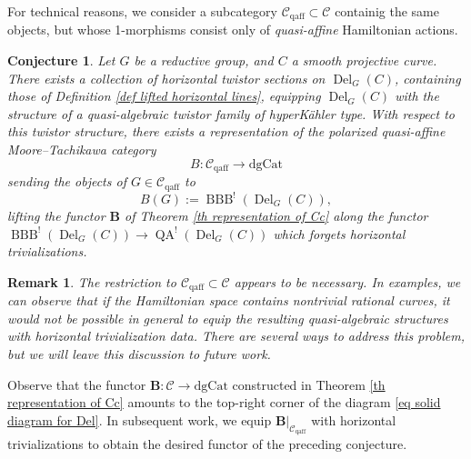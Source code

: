 \documentclass[11pt, a4paper]{amsart}
\numberwithin{equation}{section}
\newtheorem{conjecture}[theorem]{Conjecture}
\newtheorem{remark}[theorem]{Remark}
\theoremstyle{definition}
\theoremstyle{remark}
\DeclareMathOperator{\Del}{Del}
\DeclareMathOperator{\QA}{QA}
\DeclareMathOperator{\BBB}{BBB}
\newcommand{\Cc}{\mathcal{C}}
\newcommand{\bB}{\mathbf{B}}
\renewcommand{\to}{\longrightarrow}
\begin{document}
For technical reasons, we consider a subcategory $\Cc_{\mathrm{qaff}} \subset \Cc$ containig the same objects, but whose 1-morphisms consist only of \textit{quasi-affine} Hamiltonian actions. 
\begin{conjecture} \label{cj B-twist}
Let $G$ be a reductive group, and $C$ a smooth projective curve. There exists a collection of horizontal twistor sections on $\Del_G(C)$, containing those of Definition \ref{def lifted horizontal lines}, equipping $\Del_G(C)$ with the structure of a quasi-algebraic twistor family of hyperKähler type. With respect to this twistor structure, there exists a representation of the polarized \textit{quasi-affine} Moore--Tachikawa category 
\[
B : \Cc_{\mathrm{qaff}} \to \mathrm{dgCat}
\]
sending the objects of $G \in \Cc_{\mathrm{qaff}}$ to 
\[
B(G) := \BBB^!(\Del_G(C)), 
\]
lifting the functor $\bB$ of Theorem \ref{th representation of Cc} along the functor $\BBB^!(\Del_G(C)) \to \QA^!(\Del_G(C))$ which forgets horizontal trivializations.
\end{conjecture}
\begin{remark}
    The restriction to $\Cc_{\mathrm{qaff}} \subset \Cc$ appears to be necessary. In examples, we can observe that if the Hamiltonian space contains nontrivial rational curves, it would not be possible in general to equip the resulting quasi-algebraic structures with horizontal trivialization data. There are several ways to address this problem, but we will leave this discussion to future work.
\end{remark}
Observe that the functor $\bB : \Cc \to \mathrm{dgCat}$ constructed in Theorem \ref{th representation of Cc} amounts to the top-right corner of the diagram \eqref{eq solid diagram for Del}. In subsequent work, we equip $\bB|_{\Cc_{\mathrm{qaff}}}$ with horizontal trivializations to obtain the desired functor of the preceding conjecture.
\end{document}
